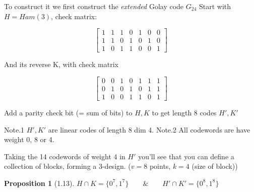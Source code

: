 \documentclass[]{amsart}
\newtheorem{prop}[thm]{Proposition}
\theoremstyle{definition}
\theoremstyle{remark}
\numberwithin{equation}{section}
\begin{document}
To construct it we first construct the \emph{extended} Golay code $G_24$
Start with $H = Ham(3)$, check matrix:

\[
	\begin{bmatrix}
	1 & 1 & 1 & 0 & 1 & 0 & 0  \\
	1 & 1 & 0 & 1 & 0 & 1 & 0  \\
	1 & 0 & 1 & 1 & 0 & 0 & 1
	\end{bmatrix}
\]

And its reverse K, with check matrix

\[
	\begin{bmatrix}
	0 & 0 & 1 & 0 & 1 & 1 & 1\\
	0 & 1 & 0 & 1 & 0 & 1 & 1\\
	1 & 0 & 0 & 1 & 1 & 0 & 1
	\end{bmatrix}
\]

Add a parity check bit (= sum of bits) to $H, K$ to get length 8 codes $H', K'$


Note.1 $H', K'$ are linear codes of length 8 dim 4.
Note.2 All codewords are have weight 0, 8 or 4.

Taking the 14 codewords of weight 4 in $H'$ you'll see that you can define a collection of blocks, forming a 3-design. ($v=8$ points, $k=4$ (size of block))

\begin{prop}[1.13]
$H \cap K = \{0^7, 1^7\} \qquad \&  \qquad H'\cap K' = \{0^8, 1^8 \}$
\end{prop}
\end{document}
